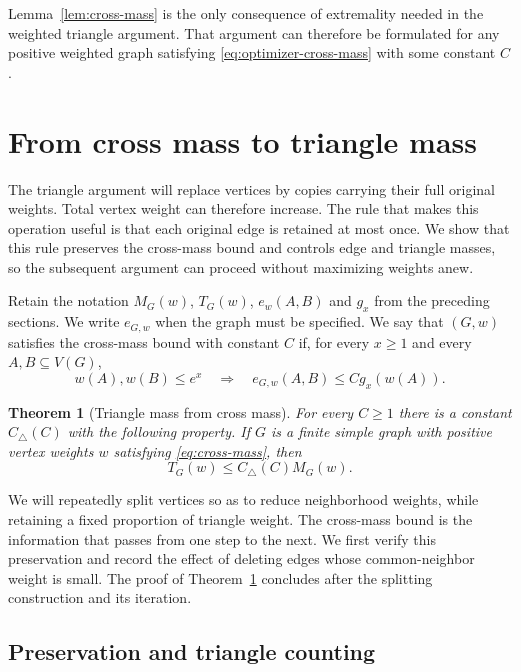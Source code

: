 \documentclass[11pt]{article}
\newtheorem{theorem}{Theorem}[section]
\theoremstyle{definition}
\theoremstyle{remark}
\numberwithin{equation}{section}
\begin{document}
Lemma~\ref{lem:cross-mass} is the only consequence of extremality
needed in the weighted triangle argument.  That argument can therefore
be formulated for any positive weighted graph satisfying
\eqref{eq:optimizer-cross-mass} with some constant $C$.

\section{From cross mass to triangle mass}
\label{sec:triangle}

The triangle argument will replace vertices by copies carrying their full
original weights. Total vertex weight can therefore increase. The rule
that makes this operation useful is that each original edge is retained
at most once. We show that this rule preserves the cross-mass bound and
controls edge and triangle masses, so the subsequent argument can proceed
without maximizing weights anew.

Retain the notation $M_G(w)$, $T_G(w)$, $e_w(A,B)$ and $g_x$
from the preceding sections. We write $e_{G,w}$ when the graph must
be specified. We say that $(G,w)$ satisfies
the cross-mass bound with constant $C$ if, for every $x\ge1$ and every
$A,B\subseteq V(G)$,
\begin{equation}
 \label{eq:cross-mass}
 w(A),w(B)\le e^x
 \quad\Longrightarrow\quad
 e_{G,w}(A,B)\le Cg_x(w(A)).
\end{equation}

\begin{theorem}[Triangle mass from cross mass]
\label{thm:weighted-triangles}
For every $C\ge1$ there is a constant $C_{\triangle}(C)$ with the
following property.  If $G$ is a finite simple graph with positive
vertex weights $w$ satisfying \eqref{eq:cross-mass}, then
\[
 T_G(w)\le C_{\triangle}(C)M_G(w).
\]
\end{theorem}

We will repeatedly split vertices so as to reduce neighborhood weights,
while retaining a fixed proportion of triangle weight.  The cross-mass
bound is the information that passes from one step to the next.  We first
verify this preservation and record the effect of deleting edges whose
common-neighbor weight is small.  The proof of
Theorem~\ref{thm:weighted-triangles} concludes after the splitting
construction and its iteration.

\subsection{Preservation and triangle counting}
\end{document}
